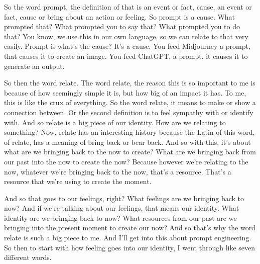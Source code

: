 \documentclass{article}
\begin{document}
\medskip

So the word prompt, the definition of that is an event or fact, cause, an event or fact, cause or
bring about an action or feeling. So prompt is a cause. What prompted that? What prompted you to
say that? What prompted you to do that? You know, we use this in our own language, so we can relate
to that very easily. Prompt is what's the cause? It's a cause. You feed Midjourney a prompt, that
causes it to create an image. You feed ChatGPT, a prompt, it causes it to generate an output.

\medskip

So then the word relate. The word relate, the reason this is so important to me is because
of how seemingly simple it is, but how big of an impact it has. To me, this is like the
crux of everything. So the word relate, it means to make or show a connection between.
Or the second definition is to feel sympathy with or identify with. And so relate is a big
piece of our identity. How are we relating to something? Now, relate has an interesting history
because the Latin of this word, of relate, has a meaning of bring back or bear back. And so
with this, it's about what are we bringing back to the now to create? What are we bringing back
from our past into the now to create the now? Because however we're relating to the now,
whatever we're bringing back to the now, that's a resource. That's a resource that we're using to
create the moment. 

\medskip

And so that goes to our feelings, right? What feelings are we bringing
back to now? And if we're talking about our feelings, that means our identity. What identity
are we bringing back to now? What resources from our past are we bringing into the present moment
to create our now? And so that's why the word relate is such a big piece to me. And I'll get
into this about prompt engineering. So then to start with how feeling goes into our identity,
I went through like seven different words. 

\medskip
\end{document}
